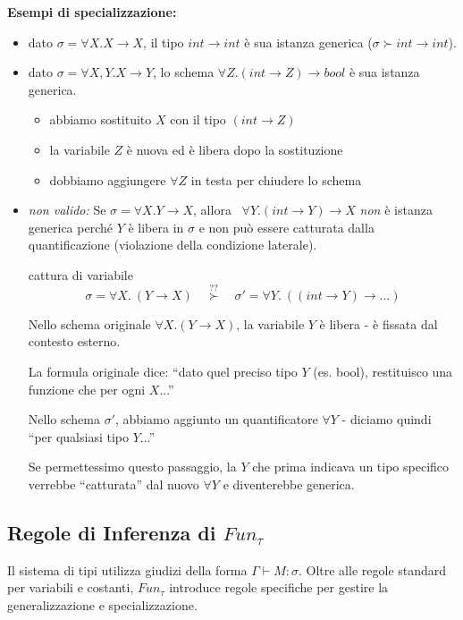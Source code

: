 \documentclass[a4paper,11pt]{report}
\begin{document}
\textbf{Esempi di specializzazione:}
\begin{itemize}
    \item dato $\sigma = \forall X. X \to X$, il tipo $int \to int$ è sua istanza generica ($\sigma \succ int \to int$).
    
    \item dato $\sigma = \forall X, Y. X \to Y$, lo schema $\forall Z. (int \to Z) \to bool$ è sua istanza generica.

    \begin{itemize}
        \item[$\hookrightarrow$] abbiamo sostituito $X$ con il tipo $(int \to Z)$
        \item[$\hookrightarrow$] la variabile $Z$ è nuova ed è libera dopo la sostituzione
        \item[$\hookrightarrow$] dobbiamo aggiungere $\forall Z$ in testa per chiudere lo schema
    \end{itemize}

    \item \textit{non valido:} Se $\sigma = \forall X. Y \to X$, allora \ $\forall Y. (int \to Y) \to X$ \textit{non} è istanza generica perché $Y$ è libera in $\sigma$ e non può essere catturata dalla quantificazione (violazione della condizione laterale).
        \begin{gframe}{cattura di variabile}
            \vspace{-1em}
            \[ \sigma = \forall X.\ (Y \to X) \quad \overset{??}{\succ} \quad \sigma' = \forall Y.\ ((int \to Y) \to \dots) \]

    Nello schema originale \( \forall X. (Y \to X) \), la variabile \( Y \) è libera - è fissata dal contesto esterno.         

    La formula originale dice: ``dato quel preciso tipo \( Y \) (es. bool), restituisco una funzione che per ogni \( X \)...''

    Nello schema \( \sigma' \), abbiamo aggiunto un quantificatore \( \forall Y \) - diciamo quindi ``per qualsiasi tipo \( Y \)...''
    
    Se permettessimo questo passaggio, la \( Y \) che prima indicava un tipo specifico  verrebbe ``catturata'' dal nuovo \( \forall Y \) e diventerebbe generica.
   \end{gframe}
\end{itemize}

\subsection{Regole di Inferenza di $Fun_{\tau}$}
Il sistema di tipi utilizza giudizi della forma $\Gamma \vdash M : \sigma$. Oltre alle regole standard per variabili e costanti, $Fun_{\tau}$ introduce regole specifiche per gestire la generalizzazione e specializzazione.
\end{document}
